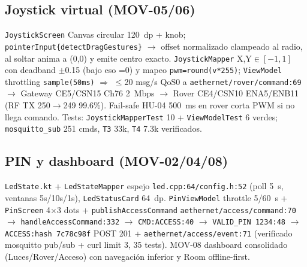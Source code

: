 \documentclass[conference]{IEEEtran}
\begin{document}
\subsection{Joystick virtual (MOV-05/06)}
\texttt{JoystickScreen} Canvas circular 120~dp + knob; \texttt{pointerInput\{detectDragGestures\}} $\rightarrow$ offset normalizado clampeado al radio, al soltar anima a (0,0) y emite centro exacto. \texttt{JoystickMapper} X,Y$\in[-1,1]$ con deadband $\pm$0.15 (bajo eso =0) y mapeo \texttt{pwm=round(v*255)}; \texttt{ViewModel} throttling \texttt{sample(50ms)} $\Rightarrow$ $\leq$20 msg/s QoS0 a \texttt{aethernet/rover/command:69} $\rightarrow$ Gateway CE5/CSN15 Ch76 2~Mbps $\rightarrow$ Rover CE4/CSN10 ENA5/ENB11 (RF TX 250$\rightarrow$249 99.6\%). Fail-safe HU-04 500~ms en rover corta PWM si no llega comando. Tests: \texttt{JoystickMapperTest} 10 + \texttt{ViewModelTest} 6 verdes; \texttt{mosquitto\_sub} 251 cmds, \texttt{T3} 33k, \texttt{T4} 7.3k verificados.

\subsection{PIN y dashboard (MOV-02/04/08)}
\texttt{LedState.kt} + \texttt{LedStateMapper} espejo \texttt{led.cpp:64/config.h:52} (poll 5~s, ventanas 5s/10s/1s), \texttt{LedStatusCard} 64~dp. \texttt{PinViewModel} throttle 5/60~s + \texttt{PinScreen} 4$\times$3 dots + \texttt{publishAccessCommand} \texttt{aethernet/access/command:70} $\rightarrow$ \texttt{handleAccessCommand:332} $\rightarrow$ \texttt{CMD:ACCESS:40} $\rightarrow$ \texttt{VALID\_PIN 1234:48} $\rightarrow$ \texttt{ACCESS:hash 7c78c98f} POST 201 + \texttt{aethernet/access/event:71} (verificado mosquitto pub/sub + curl limit 3, 35 tests). MOV-08 dashboard consolidado (Luces/Rover/Acceso) con navegación inferior y Room offline-first.
\end{document}
